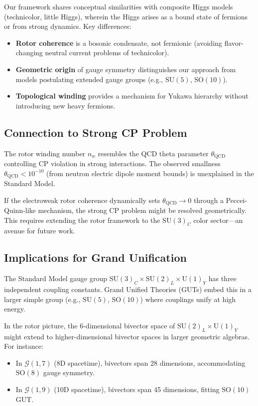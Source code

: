 \documentclass[11pt,a4paper]{article}
\newcommand{\SU}{\mathrm{SU}}
\newcommand{\U}{\mathrm{U}}
\newcommand{\SO}{\mathrm{SO}}
\theoremstyle{definition}
\theoremstyle{plain}
\theoremstyle{remark}
\begin{document}
Our framework shares conceptual similarities with composite Higgs models (technicolor, little Higgs), wherein the Higgs arises as a bound state of fermions or from strong dynamics. Key differences:
\begin{itemize}
  \item \textbf{Rotor coherence} is a bosonic condensate, not fermionic (avoiding flavor-changing neutral current problems of technicolor).
  \item \textbf{Geometric origin} of gauge symmetry distinguishes our approach from models postulating extended gauge groups (e.g., $\SU(5)$, $\SO(10)$).
  \item \textbf{Topological winding} provides a mechanism for Yukawa hierarchy without introducing new heavy fermions.
\end{itemize}

\subsection{Connection to Strong CP Problem}

The rotor winding number $n_w$ resembles the QCD theta parameter $\theta_{\text{QCD}}$ controlling CP violation in strong interactions. The observed smallness $\theta_{\text{QCD}} < 10^{-10}$ (from neutron electric dipole moment bounds) is unexplained in the Standard Model.

If the electroweak rotor coherence dynamically sets $\theta_{\text{QCD}} \to 0$ through a Peccei-Quinn-like mechanism, the strong CP problem might be resolved geometrically. This requires extending the rotor framework to the $\SU(3)_C$ color sector---an avenue for future work.

\subsection{Implications for Grand Unification}

The Standard Model gauge group $\SU(3)_C \times \SU(2)_L \times \U(1)_Y$ has three independent coupling constants. Grand Unified Theories (GUTs) embed this in a larger simple group (e.g., $\SU(5)$, $\SO(10)$) where couplings unify at high energy.

In the rotor picture, the 6-dimensional bivector space of $\SU(2)_L \times \U(1)_Y$ might extend to higher-dimensional bivector spaces in larger geometric algebras. For instance:
\begin{itemize}
  \item In $\mathcal{G}(1,7)$ (8D spacetime), bivectors span 28 dimensions, accommodating $\SO(8)$ gauge symmetry.
  \item In $\mathcal{G}(1,9)$ (10D spacetime), bivectors span 45 dimensions, fitting $\SO(10)$ GUT.
\end{itemize}
\end{document}
